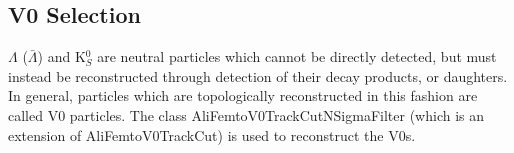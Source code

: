 \subsection{V0 Selection}
\label{V0Selection}

$\Lambda$ ($\bar{\Lambda}$) and K$^{0}_{S}$ are neutral particles which cannot be directly detected, but must instead be reconstructed through detection of their decay products, or daughters.  
In general, particles which are topologically reconstructed in this fashion are called V0 particles.
The class AliFemtoV0TrackCutNSigmaFilter (which is an extension of AliFemtoV0TrackCut) is used to reconstruct the V0s.


